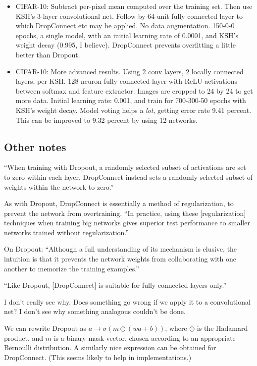 \documentclass[12pt]{report}
\begin{document}
\begin{itemize}
\item CIFAR-10: Subtract per-pixel mean computed over the training
  set.  Then use KSH's 3-layer convolutional net.  Follow by 64-unit
  fully connected layer to which DropConnect etc may be applied.  No
  data augmentation. 150-0-0 epochs, a single model, with an initial
  learning rate of 0.0001, and KSH's weight decay (0.995, I believe).
  DropConnect prevents overfitting a little better than Dropout.

\item CIFAR-10: More advanced results.  Using 2 conv layers, 2 locally
  connected layers, per KSH.  128 neuron fully connected layer with
  ReLU activations between softmax and feature extractor.  Images are
  cropped to 24 by 24 to get more data.  Initial learning rate: 0.001,
  and train for 700-300-50 epochs with KSH's weight decay.  Model
  voting helps a \emph{lot}, getting error rate 9.41 percent.  This
  can be improved to 9.32 percent by using 12 networks.

\end{itemize}

\subsection{Other notes}

``When training with Dropout, a randomly selected subset of
activations are set to zero within each layer.  DropConnect instead
sets a randomly selected subset of weights within the network to
zero.''

As with Dropout, DropConnect is essentially a method of
regularization, to prevent the network from overtraining.  ``In
practice, using these [regularization] techniques when training big
networks gives superior test performance to smaller networks trained
without regularization.''

On Dropout: ``Although a full understanding of its mechanism is
elusive, the intuition is that it prevents the network weights from
collaborating with one another to memorize the training examples.''

``Like Dropout, [DropConnect] is suitable for fully connected layers only.''

I don't really see why.  Does something go wrong if we apply it to a
convolutional net?  I don't see why something analogous couldn't be
done.

We can rewrite Dropout as $a \rightarrow \sigma(m \odot (wa+b))$,
where $\odot$ is the Hadamard product, and $m$ is a binary mask
vector, chosen according to an appropriate Bernoulli distribution.  A
similarly nice expression can be obtained for DropConnect.  (This
seems likely to help in implementations.)
\end{document}
